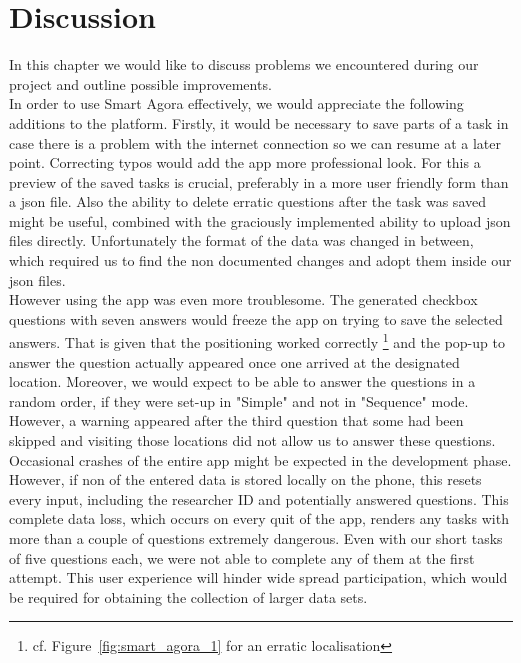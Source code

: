 \documentclass[letterpaper]{article}
\newcommand{\mypar}[1]{{\bf #1.}}
\begin{document}
\section{Discussion}\label{sec:discussion}
In this chapter we would like to discuss problems we encountered during our project and outline possible improvements.
\\
\indent \mypar{Smart Agora}
In order to use Smart Agora effectively, we would appreciate the following additions to the platform. Firstly,
it would be necessary to save parts of a task in case there is a problem with the internet connection
so we can resume at a later point. Correcting typos would add the app more professional look. For this a preview of the saved tasks is crucial,
preferably in a more user friendly form than a json file. Also the ability to delete erratic questions after the task was saved
might be useful, combined with the graciously implemented ability to upload json files directly. Unfortunately the format
of the data was changed in between, which required us to find the non documented changes and adopt them inside our json files.\\
\indent However using the app was even more troublesome. The generated checkbox questions with seven answers would freeze
the app on trying to save the selected answers. That is given that the positioning worked correctly
\footnote{cf. Figure~\ref{fig:smart_agora_1} for an erratic localisation} and the pop-up to answer the question actually
appeared once one arrived at the designated location. Moreover, we would expect to be able to answer the questions in a random order,
if they were set-up in "Simple" and not in "Sequence" mode. However, a warning appeared after the third question that some had been skipped
and visiting those locations did not allow us to answer these questions.\\

\indent Occasional crashes of the entire app might be expected in the development phase. However, if non of the entered data
is stored locally on the phone, this resets every input, including the researcher ID and potentially answered questions.
This complete data loss, which occurs on every quit of the app, renders any tasks with more than a couple of questions extremely dangerous.
Even with our short tasks of five questions each, we were not able to complete any of them at the first attempt. This user experience will
hinder wide spread participation, which would be required for obtaining the collection of larger data sets.
\end{document}
